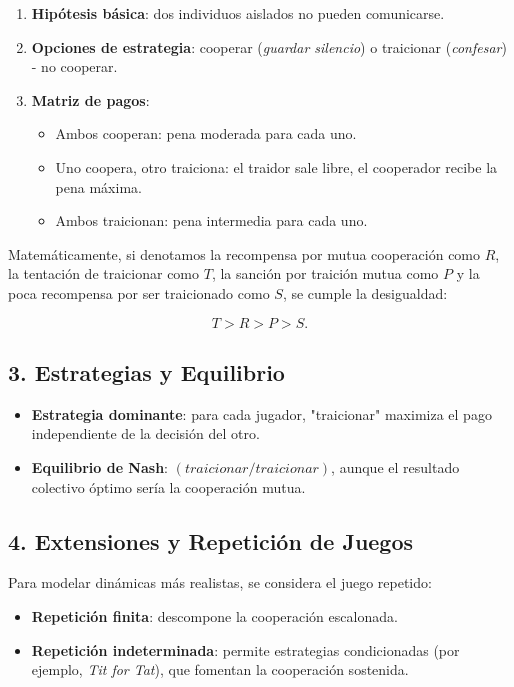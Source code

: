 \documentclass{article}
\begin{document}
\begin{enumerate}
  \item \textbf{Hipótesis básica}: dos individuos aislados no pueden comunicarse.
  \item \textbf{Opciones de estrategia}: cooperar (\emph{guardar silencio}) o 
    traicionar (\emph{confesar}) - no cooperar.
  \item \textbf{Matriz de pagos}:\newline
  \begin{itemize}
    \item Ambos cooperan: pena moderada para cada uno.
    \item Uno coopera, otro traiciona: el traidor sale libre, el cooperador recibe la pena máxima.
    \item Ambos traicionan: pena intermedia para cada uno.
  \end{itemize}
\end{enumerate}

Matemáticamente, si denotamos la recompensa por mutua cooperación como $R$, 
la tentación de traicionar como $T$, la sanción por traición mutua como $P$ y la poca recompensa 
por ser traicionado como $S$, se cumple la desigualdad:

\[
T > R > P > S.
\]

\subsection{3. Estrategias y Equilibrio}
\begin{itemize}
  \item \textbf{Estrategia dominante}: para cada jugador, "traicionar" maximiza el pago 
    independiente de la decisión del otro.
  \item \textbf{Equilibrio de Nash}: $(traicionar / traicionar)$, aunque el resultado 
    colectivo óptimo sería la cooperación mutua.
\end{itemize}

\subsection{4. Extensiones y Repetición de Juegos}
Para modelar dinámicas más realistas, se considera el juego repetido:

\begin{itemize}
  \item \textbf{Repetición finita}: descompone la cooperación escalonada.
  \item \textbf{Repetición indeterminada}: permite estrategias condicionadas 
    (por ejemplo, \emph{Tit for Tat}), que fomentan la cooperación sostenida.
\end{itemize}
\end{document}
